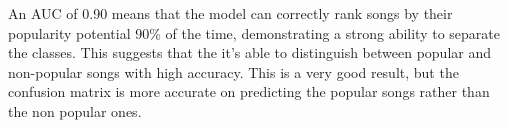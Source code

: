 An AUC of 0.90 means that the model can correctly rank songs by their popularity potential 90\% of the time, demonstrating a strong ability to separate the classes. This suggests that the it's able to distinguish between popular and non-popular songs with high accuracy. This is a very good result, but the confusion matrix is more accurate on predicting the popular songs rather than the non popular ones.